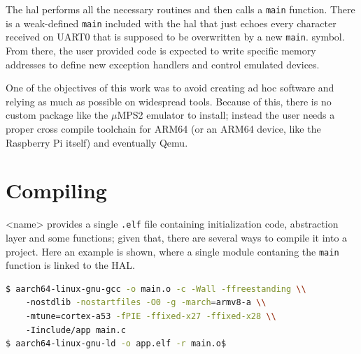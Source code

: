 \documentclass[12pt,a4paper,openright,twoside]{report}
\begin{document}
The hal performs all the necessary routines and then calls a {\tt main} function.
There is a weak-defined {\tt main} included with the hal that just echoes every
character received on UART0 that is supposed to be overwritten by a new {\tt main}.
symbol.
From there, the user provided code is expected to write specific memory addresses
to define new exception handlers and control emulated devices. 

One of the objectives of this work was to avoid creating ad hoc software and
relying as much as possible on widespread tools. Because of this, there is no
custom package like the $\mu$MPS2 emulator to install; instead the user needs
a proper cross compile toolchain for ARM64 (or an ARM64 device, like the Raspberry
Pi itself) and eventually Qemu.

\section{Compiling}
\label{compiling}
<name> provides a single {\tt .elf} file containing initialization code, abstraction
layer and some functions; given that, there are several ways to compile it 
into a project. Here an example is shown, where a single module contaning the {\tt main}
function is linked to the HAL.

\begin{lstlisting}[language=bash]
$ aarch64-linux-gnu-gcc -o main.o -c -Wall -ffreestanding \\
    -nostdlib -nostartfiles -O0 -g -march=armv8-a \\
    -mtune=cortex-a53 -fPIE -ffixed-x27 -ffixed-x28 \\
    -Iinclude/app main.c
$ aarch64-linux-gnu-ld -o app.elf -r main.o$
\end{lstlisting}
\end{document}

